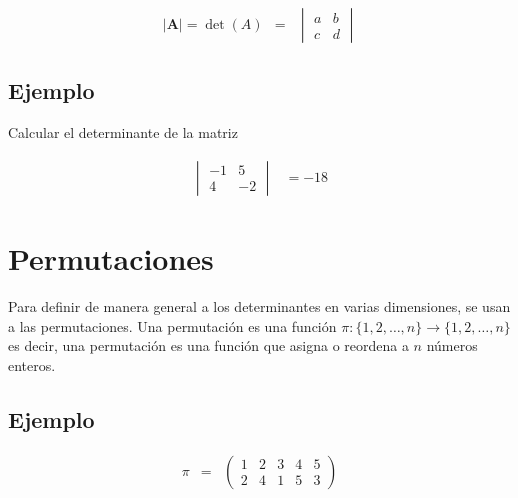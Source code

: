 \documentclass[
]{article}
\begin{document}
\begin{equation}
 \begin{array}{ccc}
 |\mathbf{A}|=\det(A) & = &
  \begin{vmatrix}
    a  &  b \\
    c  & d 
 \end{vmatrix}
 \end{array}
\end{equation}

\hypertarget{ejemplo}{%
\subsection{Ejemplo}\label{ejemplo}}

Calcular el determinante de la matriz

\begin{equation*}
 \begin{array}{cc}
  \begin{vmatrix}
    -1  &  5 \\
     4  &  -2 
 \end{vmatrix} & = -18
 \end{array}
\end{equation*}

\hypertarget{permutaciones}{%
\section{Permutaciones}\label{permutaciones}}

\small

Para definir de manera general a los determinantes en varias
dimensiones, se usan a las permutaciones. Una permutación es una función
\(\pi:\{1,2,\ldots,n\}\rightarrow \{1,2,\ldots,n\}\) es decir, una
permutación es una función que asigna o reordena a \(n\) números
enteros.

\hypertarget{ejemplo-1}{%
\subsection{Ejemplo}\label{ejemplo-1}}

\smallsize

\begin{equation*}
\begin{array}{ccc}
\pi &= & \begin{pmatrix} 1 & 2 & 3 & 4 & 5 \\ 2 & 4 & 1 & 5 & 3 \end{pmatrix}
\end{array}
\end{equation*}
\end{document}
